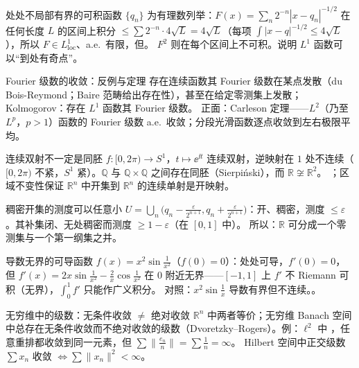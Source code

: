 \begin{结论}{处处不局部有界的可积函数}
$\{q_n\}$ 为有理数列举：$F(x)=\sum_n2^{-n}|x-q_n|^{-1/2}$ 在任何长度 $L$ 的区间上积分 $\le\sum2^{-n}\cdot4\sqrt L=4\sqrt L$（每项 $\int|x-q|^{-1/2}\le4\sqrt L$），所以 $F\in L^1_{\text{loc}}$、a.e.\ 有限，但。
$F^2$ 则在每个区间上不可积。说明 $L^1$ 函数可以“到处有奇点”。
\end{结论}

\begin{结论}{Fourier 级数的收敛：反例与定理}
存在连续函数其 Fourier 级数在某点发散（du Bois-Reymond；Baire 范畴给出存在性），甚至在给定零测集上发散；Kolmogorov：存在 $L^1$ 函数其 Fourier 级数。
正面：Carleson 定理——$L^2$（乃至 $L^p$，$p>1$）函数的 Fourier 级数 a.e.\ 收敛；分段光滑函数逐点收敛到左右极限平均。
\end{结论}

\begin{结论}{连续双射不一定是同胚}
$f:[0,2\pi)\to S^1$，$t\mapsto\ee^{\ii t}$ 连续双射，逆映射在 $1$ 处不连续（$[0,2\pi)$ 不紧，$S^1$ 紧）。$\mathbb Q$ 与 $\mathbb Q\times\mathbb Q$ 之间存在同胚（Sierpiński），而 $\mathbb R\not\cong\mathbb R^2$。
；区域不变性保证 $\mathbb R^n$ 中开集到 $\mathbb R^n$ 的连续单射是开映射。
\end{结论}

\begin{结论}{稠密开集的测度可以任意小}
$U=\bigcup_n\bigl(q_n-\frac{\varepsilon}{2^{n+1}},q_n+\frac{\varepsilon}{2^{n+1}}\bigr)$：开、稠密，测度 $\le\varepsilon$。其补集闭、无处稠密而测度 $\ge1-\varepsilon$（在 $[0,1]$ 中）。
所以：$\mathbb R$ 可分成一个零测集与一个第一纲集之并。
\end{结论}

\begin{结论}{导数无界的可导函数}
$f(x)=x^2\sin\frac1{x^2}$（$f(0)=0$）：处处可导，$f'(0)=0$，但 $f'(x)=2x\sin\frac1{x^2}-\frac2x\cos\frac1{x^2}$ 在 $0$ 附近无界——$[-1,1]$ 上 $f'$ 不 Riemann 可积（无界），$\int_0^1f'$ 只能作广义积分。
对照：$x^2\sin\frac1x$ 导数有界但不连续。。
\end{结论}

\begin{结论}{无穷维中的级数：无条件收敛 $\ne$ 绝对收敛}
$\mathbb R^n$ 中两者等价；无穷维 Banach 空间中总存在无条件收敛而不绝对收敛的级数（Dvoretzky--Rogers）。例：$\ell^2$ 中 ，任意重排都收敛到同一元素，但 $\sum\bigl\|\frac{e_n}n\bigr\|=\sum\frac1n=\infty$。
Hilbert 空间中正交级数 $\sum x_n$ 收敛 $\iff\sum\|x_n\|^2<\infty$。
\end{结论}

